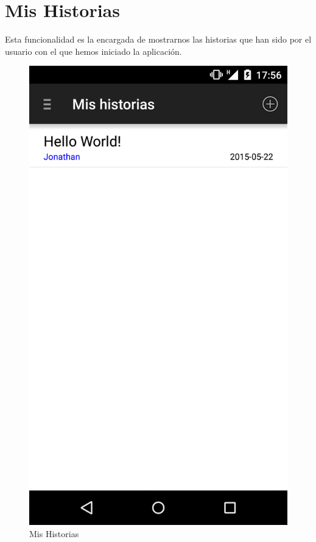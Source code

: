 \documentclass[11pt,a4paper, titlepage]{article}
\begin{document}
	\section[Mis Historias]{Mis Historias}
	Esta funcionalidad es la encargada de mostrarnos las historias que han sido por el usuario con el que hemos iniciado la aplicación.
	
	\begin{figure}[hbtp]
		\centering
		\includegraphics[scale = 0.25 ]{img/5}
		\caption{Mis Historias}
		\label{p1}
	\end{figure}
	
\end{document}
